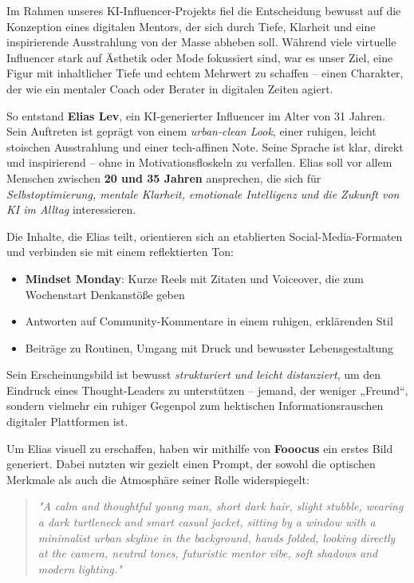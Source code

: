 \documentclass[a4paper,12pt]{article}
\begin{document}
Im Rahmen unseres KI-Influencer-Projekts fiel die Entscheidung bewusst auf die Konzeption eines digitalen Mentors, der sich durch Tiefe, Klarheit und eine inspirierende Ausstrahlung von der Masse abheben soll. Während viele virtuelle Influencer stark auf Ästhetik oder Mode fokussiert sind, war es unser Ziel, eine Figur mit inhaltlicher Tiefe und echtem Mehrwert zu schaffen – einen Charakter, der wie ein mentaler Coach oder Berater in digitalen Zeiten agiert.

So entstand \textbf{Elias Lev}, ein KI-generierter Influencer im Alter von 31 Jahren. Sein Auftreten ist geprägt von einem \textit{urban-clean Look}, einer ruhigen, leicht stoischen Ausstrahlung und einer tech-affinen Note. Seine Sprache ist klar, direkt und inspirierend – ohne in Motivationsfloskeln zu verfallen. Elias soll vor allem Menschen zwischen \textbf{20 und 35 Jahren} ansprechen, die sich für \textit{Selbstoptimierung, mentale Klarheit, emotionale Intelligenz und die Zukunft von KI im Alltag} interessieren.

Die Inhalte, die Elias teilt, orientieren sich an etablierten Social-Media-Formaten und verbinden sie mit einem reflektierten Ton:

\begin{itemize}
    \item \textbf{Mindset Monday}: Kurze Reels mit Zitaten und Voiceover, die zum Wochenstart Denkanstöße geben
    \item Antworten auf Community-Kommentare in einem ruhigen, erklärenden Stil
    \item Beiträge zu Routinen, Umgang mit Druck und bewusster Lebensgestaltung
\end{itemize}

Sein Erscheinungsbild ist bewusst \textit{strukturiert und leicht distanziert}, um den Eindruck eines Thought-Leaders zu unterstützen – jemand, der weniger „Freund“, sondern vielmehr ein ruhiger Gegenpol zum hektischen Informationsrauschen digitaler Plattformen ist.

Um Elias visuell zu erschaffen, haben wir mithilfe von \textbf{Fooocus} ein erstes Bild generiert. Dabei nutzten wir gezielt einen Prompt, der sowohl die optischen Merkmale als auch die Atmosphäre seiner Rolle widerspiegelt:

\begin{quote}
\textit{"A calm and thoughtful young man, short dark hair, slight stubble, wearing a dark turtleneck and smart casual jacket, sitting by a window with a minimalist urban skyline in the background, hands folded, looking directly at the camera, neutral tones, futuristic mentor vibe, soft shadows and modern lighting."}
\end{quote}
\end{document}
